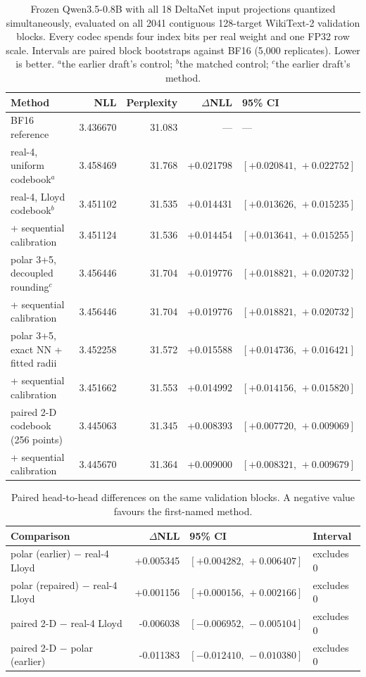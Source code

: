 \begin{table}[ht]
\centering\small
\caption{Frozen Qwen3.5-0.8B with all 18 DeltaNet input projections quantized
simultaneously, evaluated on all 2041 contiguous 128-target
WikiText-2 validation blocks. Every codec spends four index bits per real weight
and one FP32 row scale. Intervals are paired block bootstraps against BF16
(5{,}000 replicates). Lower is better.
$^{a}$the earlier draft's control; $^{b}$the matched control;
$^{c}$the earlier draft's method.}
\label{tab:main}
\begin{tabular}{lrrrl}\toprule
Method & NLL & Perplexity & $\Delta$NLL & 95\% CI\\\midrule
BF16 reference & 3.436670 & 31.083 & --- & ---\\
\midrule
real-4, uniform codebook$^{a}$ & 3.458469 & 31.768 & +0.021798 & $[+0.020841,\,+0.022752]$\\
real-4, Lloyd codebook$^{b}$ & 3.451102 & 31.535 & +0.014431 & $[+0.013626,\,+0.015235]$\\
\quad + sequential calibration & 3.451124 & 31.536 & +0.014454 & $[+0.013641,\,+0.015255]$\\
polar 3+5, decoupled rounding$^{c}$ & 3.456446 & 31.704 & +0.019776 & $[+0.018821,\,+0.020732]$\\
\quad + sequential calibration & 3.456446 & 31.704 & +0.019776 & $[+0.018821,\,+0.020732]$\\
polar 3+5, exact NN + fitted radii & 3.452258 & 31.572 & +0.015588 & $[+0.014736,\,+0.016421]$\\
\quad + sequential calibration & 3.451662 & 31.553 & +0.014992 & $[+0.014156,\,+0.015820]$\\
paired 2-D codebook (256 points) & 3.445063 & 31.345 & +0.008393 & $[+0.007720,\,+0.009069]$\\
\quad + sequential calibration & 3.445670 & 31.364 & +0.009000 & $[+0.008321,\,+0.009679]$\\
\bottomrule
\end{tabular}
\end{table}

\begin{table}[ht]
\centering\small
\caption{Paired head-to-head differences on the same validation blocks.
A negative value favours the first-named method.}
\label{tab:head}
\begin{tabular}{lrll}\toprule
Comparison & $\Delta$NLL & 95\% CI & Interval\\\midrule
polar (earlier) $-$ real-4 Lloyd & +0.005345 & $[+0.004282,\,+0.006407]$ & excludes 0\\
polar (repaired) $-$ real-4 Lloyd & +0.001156 & $[+0.000156,\,+0.002166]$ & excludes 0\\
paired 2-D $-$ real-4 Lloyd & -0.006038 & $[-0.006952,\,-0.005104]$ & excludes 0\\
paired 2-D $-$ polar (earlier) & -0.011383 & $[-0.012410,\,-0.010380]$ & excludes 0\\
\bottomrule
\end{tabular}
\end{table}

